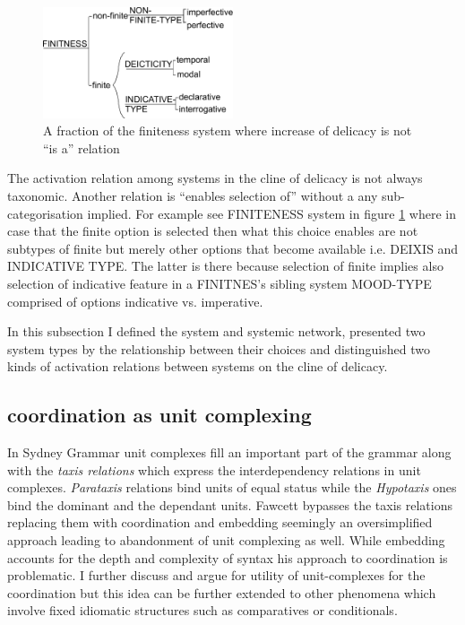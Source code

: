 \begin{figure}[hbtp]
	\centering
	\includegraphics[width=0.5\textwidth]{Figures/SFL-grammar/finitness-system.pdf}
	\caption{A fraction of the finiteness system where increase of delicacy is not ``is a'' relation}
	\label{fig:finitness-fraction}
\end{figure}

The activation relation among systems in the cline of delicacy is not always taxonomic. Another relation is ``enables selection of'' without a any sub-categorisation implied. For example see FINITENESS system in figure \ref{fig:finitness-fraction} where in case that the finite option is selected then what this choice enables are not subtypes of finite but merely other options that become available i.e. DEIXIS and INDICATIVE TYPE. The latter is there because selection of finite implies also selection of indicative feature in a FINITNES's sibling system MOOD-TYPE comprised of options indicative vs. imperative. 

In this subsection I defined the system and systemic network, presented two system types by the relationship between their choices and distinguished two kinds of activation relations between systems on the cline of delicacy.

\subsection{coordination as unit complexing}

\label{sec:coordination}
In Sydney Grammar unit complexes fill an important part of the grammar along with the \textit{taxis relations} which express the interdependency relations in unit complexes. \textit{Parataxis} relations bind units of equal status while the \textit{Hypotaxis} ones bind the dominant and  the dependant units. Fawcett bypasses the taxis relations replacing them with coordination and embedding \citep[271]{Fawcett2000} seemingly an oversimplified approach leading to abandonment of unit complexing as well. While embedding accounts for the depth and complexity of syntax his approach to coordination is problematic. I further discuss and argue for utility of unit-complexes for the coordination but this idea can be further extended to other phenomena which involve fixed idiomatic structures such as comparatives or conditionals.

